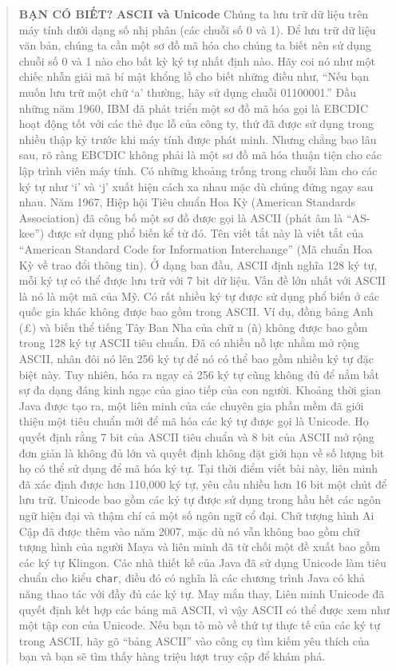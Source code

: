 \begin{quote}
\textbf{BẠN CÓ BIẾT?} \textbf{ASCII và Unicode} Chúng ta lưu trữ dữ liệu
trên máy tính dưới dạng số nhị phân (các chuỗi số 0 và 1). Để lưu trữ dữ
liệu văn bản, chúng ta cần một sơ đồ mã hóa cho chúng ta biết nên sử
dụng chuỗi số 0 và 1 nào cho bất kỳ ký tự nhất định nào. Hãy coi nó như
một chiếc nhẫn giải mã bí mật khổng lồ cho biết những điều như, ``Nếu
bạn muốn lưu trữ một chữ `a' thường, hãy sử dụng chuỗi 01100001.'' Đầu
những năm 1960, IBM đã phát triển một sơ đồ mã hóa gọi là EBCDIC hoạt
động tốt với các thẻ đục lỗ của công ty, thứ đã được sử dụng trong nhiều
thập kỷ trước khi máy tính được phát minh. Nhưng chẳng bao lâu sau, rõ
ràng EBCDIC không phải là một sơ đồ mã hóa thuận tiện cho các lập trình
viên máy tính. Có những khoảng trống trong chuỗi làm cho các ký tự như
`i' và `j' xuất hiện cách xa nhau mặc dù chúng đứng ngay sau nhau. Năm
1967, Hiệp hội Tiêu chuẩn Hoa Kỳ (American Standards Association) đã
công bố một sơ đồ được gọi là ASCII (phát âm là ``AS-kee'') được sử dụng
phổ biến kể từ đó. Tên viết tắt này là viết tắt của ``American Standard
Code for Information Interchange'' (Mã chuẩn Hoa Kỳ về trao đổi thông
tin). Ở dạng ban đầu, ASCII định nghĩa 128 ký tự, mỗi ký tự có thể được
lưu trữ với 7 bit dữ liệu. Vấn đề lớn nhất với ASCII là nó là một mã của
Mỹ. Có rất nhiều ký tự được sử dụng phổ biến ở các quốc gia khác không
được bao gồm trong ASCII. Ví dụ, đồng bảng Anh (£) và biến thể tiếng Tây
Ban Nha của chữ n (ñ) không được bao gồm trong 128 ký tự ASCII tiêu
chuẩn. Đã có nhiều nỗ lực nhằm mở rộng ASCII, nhân đôi nó lên 256 ký tự
để nó có thể bao gồm nhiều ký tự đặc biệt này. Tuy nhiên, hóa ra ngay cả
256 ký tự cũng không đủ để nắm bắt sự đa dạng đáng kinh ngạc của giao
tiếp của con người. Khoảng thời gian Java được tạo ra, một liên minh của
các chuyên gia phần mềm đã giới thiệu một tiêu chuẩn mới để mã hóa các
ký tự được gọi là Unicode. Họ quyết định rằng 7 bit của ASCII tiêu chuẩn
và 8 bit của ASCII mở rộng đơn giản là không đủ lớn và quyết định không
đặt giới hạn về số lượng bit họ có thể sử dụng để mã hóa ký tự. Tại thời
điểm viết bài này, liên minh đã xác định được hơn 110,000 ký tự, yêu cầu
nhiều hơn 16 bit một chút để lưu trữ. Unicode bao gồm các ký tự được sử
dụng trong hầu hết các ngôn ngữ hiện đại và thậm chí cả một số ngôn ngữ
cổ đại. Chữ tượng hình Ai Cập đã được thêm vào năm 2007, mặc dù nó vẫn
không bao gồm chữ tượng hình của người Maya và liên minh đã từ chối một
đề xuất bao gồm các ký tự Klingon. Các nhà thiết kế của Java đã sử dụng
Unicode làm tiêu chuẩn cho kiểu \texttt{char}, điều đó có nghĩa là các
chương trình Java có khả năng thao tác với đầy đủ các ký tự. May mắn
thay, Liên minh Unicode đã quyết định kết hợp các bảng mã ASCII, vì vậy
ASCII có thể được xem như một tập con của Unicode. Nếu bạn tò mò về thứ
tự thực tế của các ký tự trong ASCII, hãy gõ ``bảng ASCII'' vào công cụ
tìm kiếm yêu thích của bạn và bạn sẽ tìm thấy hàng triệu lượt truy cập
để khám phá.
\end{quote}

